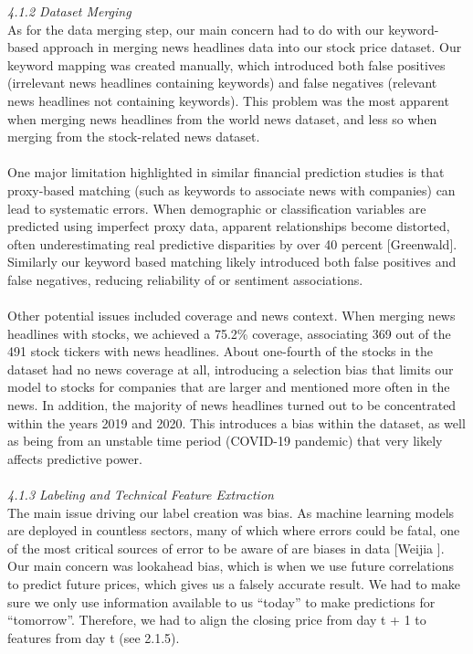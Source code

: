 \documentclass[letterpaper,12pt, twocolumn]{report}
\begin{document}
\noindent
\textit{4.1.2 Dataset Merging}\\
As for the data merging step, our main concern had to do with our keyword-based approach in merging news headlines data into our stock price dataset. Our keyword mapping was created manually, which introduced both false positives (irrelevant news headlines containing keywords) and false negatives (relevant news headlines not containing keywords). This problem was the most apparent when merging news headlines from the world news dataset, and less so when merging from the stock-related news dataset.\\\\
One major limitation highlighted in similar financial prediction studies is that proxy-based matching (such as keywords to associate news with companies) can lead to systematic errors. When demographic or classification variables are predicted using imperfect proxy data, apparent relationships become distorted, often underestimating real predictive disparities by over 40 percent [Greenwald]. Similarly our keyword based matching likely introduced both false positives and false negatives, reducing reliability of or sentiment associations. \\\\
Other potential issues included coverage and news context. When merging news headlines with stocks, we achieved a 75.2\% coverage, associating 369 out of the 491 stock tickers with news headlines. About one-fourth of the stocks in the dataset had no news coverage at all, introducing a selection bias that limits our model to stocks for companies that are larger and mentioned more often in the news. In addition, the majority of news headlines turned out to be concentrated within the years 2019 and 2020. This introduces a bias within the dataset, as well as being from an unstable time period (COVID-19 pandemic) that very likely affects predictive power.\\\\
\noindent
\textit{4.1.3 Labeling and Technical Feature Extraction}\\
The main issue driving our label creation was bias. As machine learning models are deployed in countless sectors, many of which where errors could be fatal, one of the most critical sources of error to be aware of are biases in data [Weijia ]. Our main concern was lookahead bias, which is when we use future correlations to predict future prices, which gives us a falsely accurate result. We had to make sure we only use information available to us “today” to make predictions for “tomorrow”. Therefore, we had to align the closing price from day t + 1 to features from day t (see 2.1.5). \\\\
\end{document}
